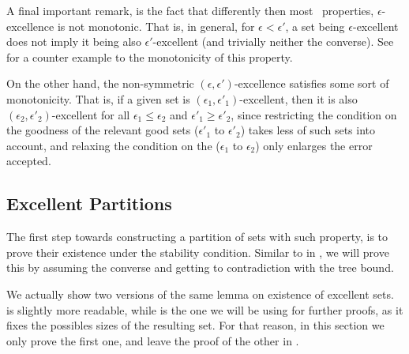         \begin{remark}
            A final important remark, is the fact that differently then most \regular~properties, $\epsilon$-excellence is
            not monotonic. 
            That is, in general, for $\epsilon < \epsilon'$, a set being $\epsilon$-excellent does not imply
            it being also $\epsilon'$-excellent (and trivially neither the converse).
            See  for a counter example to the monotonicity of this property.

            On the other hand, the non-symmetric $(\epsilon, \epsilon')$-excellence satisfies some sort of monotonicity.
            That is, if a given set is $(\epsilon_1, \epsilon'_1)$-excellent, then it is also
            $(\epsilon_2, \epsilon'_2)$-excellent for all $\epsilon_1 \leq \epsilon_2$ and $\epsilon'_1 \geq \epsilon'_2$,
            since restricting the condition on the goodness of the relevant good sets ($\epsilon'_1$ to $\epsilon'_2$)
            takes less of such sets into account, and relaxing the condition on the 
            ($\epsilon_1$ to $\epsilon_2$) only enlarges the error accepted.
        \end{remark}

    \subsection{Excellent Partitions} \label{subsec:subsection_5.2}

        The first step towards constructing a partition of sets with such property, is to prove their existence under the
        stability condition.
        Similar to  in , we will prove this by assuming
        the converse and getting to contradiction with the tree bound.

        We actually show two versions of the same lemma on existence of excellent sets.
         is slightly more readable, while
         is the one we will be using for further
        proofs, as it fixes the possibles sizes of the resulting set.
        For that reason, in this section we only prove the first one, and leave the proof of the other in
        .

